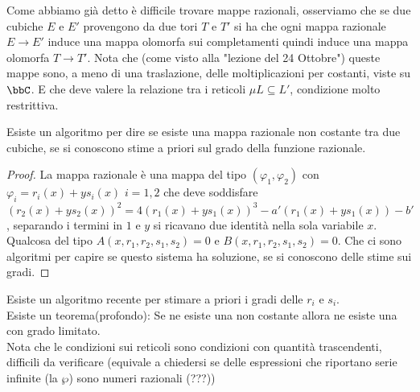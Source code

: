 Come abbiamo già detto è difficile trovare mappe razionali, osserviamo che se due cubiche $E$ e $E'$ provengono da due tori $T$ e $T'$ si ha che ogni mappa razionale $E\rightarrow E'$ induce una mappa olomorfa sui completamenti quindi induce una mappa olomorfa $T\rightarrow T'$. Nota che (come visto alla "lezione del 24 Ottobre") queste mappe sono, a meno di una traslazione, delle moltiplicazioni per costanti, viste su $\bbC$. E che deve valere la relazione tra i reticoli $\mu L\subseteq L'$, condizione molto restrittiva.

\begin{proposizione}
Esiste un algoritmo per dire se esiste una mappa razionale non costante tra due cubiche, se si conoscono stime a priori sul grado della funzione razionale.
\end{proposizione}

\begin{proof} La mappa razionale è una mappa del tipo $(\varphi_1,\varphi_2)$ con $\varphi_i=r_i(x)+y s_i(x)$ $i=1,2$  che deve soddisfare $(r_2(x)+y s_2(x))^2=4(r_1(x)+y s_1(x))^3-a'(r_1(x)+y s_1(x))-b'$, separando i termini in $1$ e $y$ si ricavano due identità nella sola variabile $x$. Qualcosa del tipo $A(x,r_1,r_2,s_1,s_2)=0$ e $B(x,r_1,r_2,s_1,s_2)=0$. Che ci sono algoritmi per capire se questo sistema ha soluzione, se si conoscono delle stime sui gradi.
\end{proof}

\begin{osservazione} Esiste un algoritmo recente per stimare a priori i gradi delle $r_i$ e $s_i$.\\
Esiste un teorema(profondo): Se ne esiste una non costante allora ne esiste una con grado limitato.\\
Nota che le condizioni sui reticoli sono condizioni con quantità trascendenti, difficili da verificare (equivale a chiedersi se delle espressioni che riportano serie infinite (la $\wp$) sono numeri razionali (???))
\end{osservazione}
